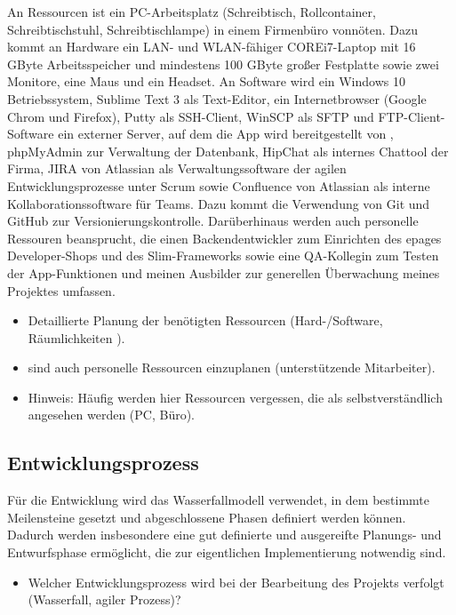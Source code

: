 An Ressourcen ist ein PC-Arbeitsplatz (Schreibtisch, Rollcontainer, Schreibtischstuhl, Schreibtischlampe) in einem Firmenbüro vonnöten. Dazu kommt an Hardware ein LAN- und WLAN-fähiger COREi7-Laptop mit 16 GByte Arbeitsspeicher und mindestens 100 GByte großer Festplatte sowie zwei Monitore, eine Maus und ein Headset. An Software wird ein Windows 10 Betriebssystem, Sublime Text 3 als Text-Editor, ein Internetbrowser (Google Chrom und Firefox), Putty als \acs{SSH}-Client, Win\acs{SCP} als \acs{SFTP} und \acs{FTP}-Client-Software ein externer Server, auf dem die App  wird bereitgestellt von , phpMyAdmin zur Verwaltung der Datenbank, HipChat als internes Chattool der Firma, JIRA von Atlassian als Verwaltungssoftware der agilen Entwicklungsprozesse unter Scrum sowie Confluence von Atlassian als interne Kollaborationssoftware für Teams. Dazu kommt die Verwendung von \acs{Git} und \acs{GitHub} zur Versionierungskontrolle. Darüberhinaus werden auch personelle Ressouren beansprucht, die einen Backendentwickler zum Einrichten des epages Developer-Shops und des Slim-Frameworks sowie eine \acs{QA}-Kollegin zum Testen der App-Funktionen und meinen Ausbilder zur generellen Überwachung meines Projektes umfassen.

\begin{itemize}
	\item Detaillierte Planung der benötigten Ressourcen (Hard-/Software, Räumlichkeiten \usw).
	\item \Ggfs sind auch personelle Ressourcen einzuplanen (\zB unterstützende Mitarbeiter).
	\item Hinweis: Häufig werden hier Ressourcen vergessen, die als selbstverständlich angesehen werden (\zB PC, Büro). 
\end{itemize}


\subsection{Entwicklungsprozess}
\label{sec:Entwicklungsprozess}

Für die Entwicklung wird das Wasserfallmodell verwendet, in dem bestimmte Meilensteine gesetzt und abgeschlossene Phasen definiert werden können. Dadurch werden insbesondere eine gut definierte und ausgereifte Planungs- und Entwurfsphase ermöglicht, die zur eigentlichen Implementierung notwendig sind. 
\begin{itemize}
	\item Welcher Entwicklungsprozess wird bei der Bearbeitung des Projekts verfolgt (\zB Wasserfall, agiler Prozess)?
\end{itemize}
